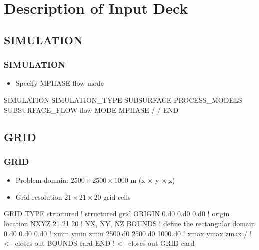 \documentclass{beamer}
\newcommand\bluecomment[1]{{{\color{blue} #1}}}
\begin{document}
\section{Description of Input Deck}

\subsection{SIMULATION}

\begin{frame}[fragile]\frametitle{SIMULATION}

\begin{itemize}
\item Specify MPHASE flow mode
\end{itemize}


\begin{semiverbatim}

SIMULATION
  SIMULATION_TYPE SUBSURFACE
  PROCESS_MODELS
    SUBSURFACE_FLOW flow
      MODE MPHASE
    /
  /
END
\end{semiverbatim}

\end{frame}

\subsection{GRID}
\begin{frame}\frametitle{GRID}

\begin{itemize}
  \item Problem domain: $2500 \times 2500 \times 1000$ m (x $\times$ y $\times$ z)
  \item Grid resolution $21 \times 21 \times 20$ grid cells
\end{itemize}

\begin{semiverbatim}
GRID
  TYPE structured        \bluecomment{! structured grid}
  ORIGIN 0.d0 0.d0 0.d0  \bluecomment{! origin location}
  NXYZ 21 21 20          \bluecomment{! NX, NY, NZ}
  BOUNDS             \bluecomment{! define the rectangular domain}
    0.d0 0.d0 0.d0   \bluecomment{! xmin ymin zmin}
    2500.d0 2500.d0 1000.d0  \bluecomment{! xmax ymax zmax}
  /  \bluecomment{! <-- closes out BOUNDS card}
END  \bluecomment{! <-- closes out GRID card}
\end{semiverbatim}

\end{frame}
\end{document}
